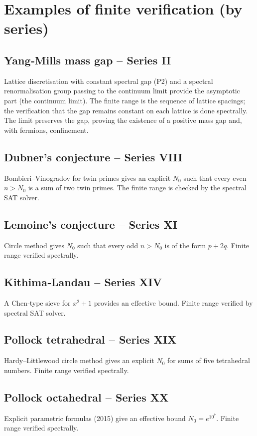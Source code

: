 \documentclass[11pt,a4paper]{article}
\begin{document}
\section{Examples of finite verification (by series)}

\subsection{Yang‑Mills mass gap – Series II}
Lattice discretisation with constant spectral gap (P2) and a spectral renormalisation group passing to the continuum limit provide the asymptotic part (the continuum limit). The finite range is the sequence of lattice spacings; the verification that the gap remains constant on each lattice is done spectrally. The limit preserves the gap, proving the existence of a positive mass gap and, with fermions, confinement.

\subsection{Dubner's conjecture – Series VIII}
Bombieri–Vinogradov for twin primes gives an explicit \(N_0\) such that every even \(n > N_0\) is a sum of two twin primes. The finite range is checked by the spectral SAT solver.

\subsection{Lemoine's conjecture – Series XI}
Circle method gives \(N_0\) such that every odd \(n > N_0\) is of the form \(p+2q\). Finite range verified spectrally.

\subsection{Kithima‑Landau – Series XIV}
A Chen‑type sieve for \(x^2+1\) provides an effective bound. Finite range verified by spectral SAT solver.

\subsection{Pollock tetrahedral – Series XIX}
Hardy–Littlewood circle method gives an explicit \(N_0\) for sums of five tetrahedral numbers. Finite range verified spectrally.

\subsection{Pollock octahedral – Series XX}
Explicit parametric formulas (2015) give an effective bound \(N_0 = e^{10^7}\). Finite range verified spectrally.
\end{document}

